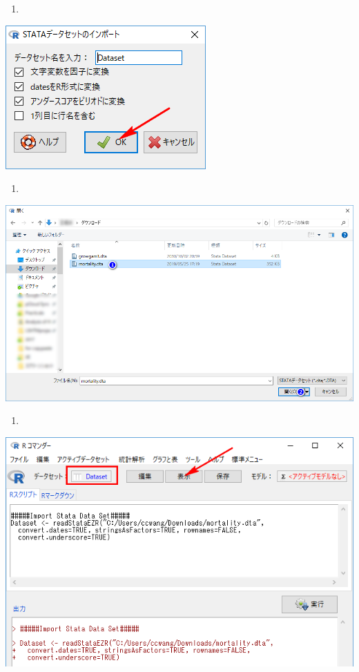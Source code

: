 \documentclass[11pt,]{problemset}
\begin{document}
\newpage

\vfill

\begin{enumerate}
\def\labelenumi{\arabic{enumi}.}
\setcounter{enumi}{1}
\item
\end{enumerate}

\begin{center}\includegraphics[width=0.3\linewidth]{pic/logstic01} \end{center}

\begin{enumerate}
\def\labelenumi{\arabic{enumi}.}
\setcounter{enumi}{2}
\item
\end{enumerate}

\begin{center}\includegraphics[width=0.7\linewidth]{pic/logstic02} \end{center}

\begin{enumerate}
\def\labelenumi{\arabic{enumi}.}
\setcounter{enumi}{3}
\item
\end{enumerate}

\begin{center}\includegraphics[width=0.7\linewidth]{pic/logstic03} \end{center}
\end{document}
